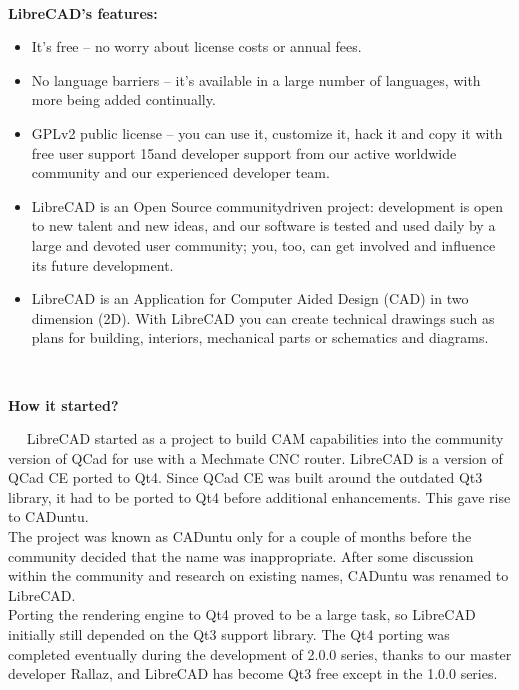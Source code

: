 \
\
\

\begin{small}
\large{\textbf{LibreCAD's features:}}
\end{small}
\begin{itemize}
\item  It's free – no worry about license costs or annual fees.
\item No  language  barriers  –  it's  available  in  a  large  number  of  languages,  with  more  being  added
continually.
\item GPLv2  public  license  –  you  can  use  it,  customize  it,  hack  it  and  copy  it  with  free  user  support
15and  developer  support  from  our  active  worldwide  community  and  our  experienced  developer
team.
\item LibreCAD  is an Open Source community­driven project: development is open to new talent and
new  ideas,  and  our  software  is  tested  and  used  daily  by  a  large  and  devoted  user  community;
you, too, can get involved and influence its future development.
\item LibreCAD  is  an  Application  for  Computer  Aided  Design  (CAD)  in  two  dimension  (2D).  With
LibreCAD  you  can  create  technical  drawings  such  as  plans  for  building,  interiors,  mechanical
parts or schematics and diagrams.
\end{itemize}


\
\
\




\begin{small}
\noindent
\large \textbf{How it started?}
\end{small}
\
\
LibreCAD  started  as  a   project  to  build  CAM  capabilities  into  the  community  version  of  QCad  for  use with  a  Mechmate  CNC  router.  LibreCAD  is  a  version  of  QCad  CE  ported  to  Qt4.  Since  QCad  CE was  built  around  the  outdated  Qt3  library,  it  had  to  be  ported  to  Qt4  before  additional  enhancements. This gave rise to CADuntu.\\
The  project  was  known as CADuntu only for a  couple of months before the community decided that the
name  was  inappropriate.  After  some  discussion  within  the  community  and  research  on  existing  names, CADuntu was renamed to LibreCAD.\\
Porting  the  rendering  engine  to  Qt4  proved  to  be  a  large  task,  so  LibreCAD  initially  still  depended  on the  Qt3  support  library.  The  Qt4  porting  was  completed  eventually  during  the  development  of  2.0.0 series,  thanks  to  our  master  developer  Rallaz,  and  LibreCAD  has  become  Qt3  free except in the 1.0.0 series.\\

